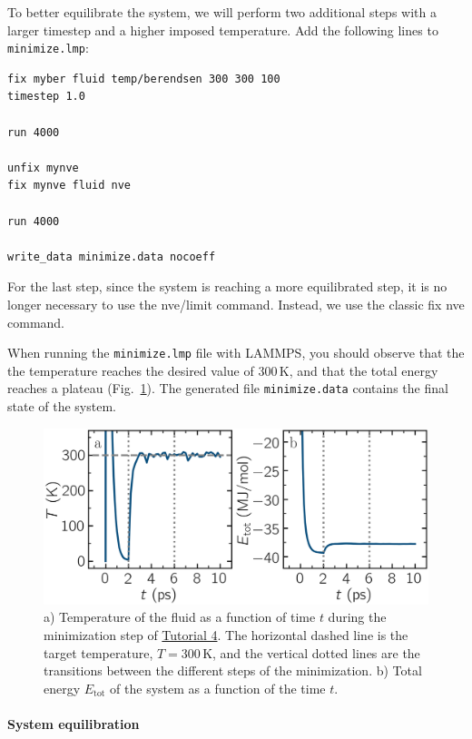 \documentclass[9pt,tutorial]{livecoms}
\newcommand{\lmpcmd}[1]{\hspace{0pt}\colorbox{listing}{\textcolor{command}{\small{#1}}}\hspace{0pt}} %
\newcommand{\flecmd}[1]{\textcolor{command}{\texttt{#1}}} %
\begin{document}
To better equilibrate the system, we will perform two additional steps
with a larger timestep and a higher imposed temperature.  Add the following lines
to \flecmd{minimize.lmp}:
\begin{lstlisting}
fix myber fluid temp/berendsen 300 300 100
timestep 1.0

run 4000

unfix mynve
fix mynve fluid nve

run 4000

write_data minimize.data nocoeff
\end{lstlisting}
For the last step, since the system is reaching a more
equilibrated step, it is no longer necessary to use the \lmpcmd{nve/limit} command.
Instead, we use the classic \lmpcmd{fix nve} command.

When running the \flecmd{minimize.lmp} file with LAMMPS, you should observe that the
the temperature reaches the desired value of $300\,\text{K}$, and that the total
energy reaches a plateau (Fig.~\ref{fig:NANOSHEAR-minimization}).  The generated file
\flecmd{minimize.data} contains the final state of the system.

\begin{figure}
\centering
\includegraphics[width=\linewidth]{NANOSHEAR-minimization}
\caption{a) Temperature of the fluid as a function of time $t$ during the
minimization step of \hyperref[sheared-confined-label]{Tutorial 4}.
The horizontal dashed line is the target temperature, $T = 300$\,K, and the
vertical dotted lines are the transitions between the different steps
of the minimization.  b) Total
energy $E_\text{tot}$ of the system as a function of the time $t$.}
\label{fig:NANOSHEAR-minimization}
\end{figure}

\paragraph{System equilibration}
\end{document}
